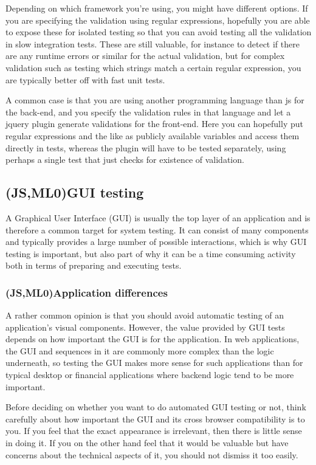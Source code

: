 \documentclass[11pt]{article}
\begin{document}
Depending on which framework you're using, you might have different options. If you are specifying the validation using regular expressions, hopefully you are able to expose these for isolated testing so that you can avoid testing all the validation in slow integration tests. These are still valuable, for instance to detect if there are any runtime errors or similar for the actual validation, but for complex validation such as testing which strings match a certain regular expression, you are typically better off with fast unit tests.

A common case is that you are using another programming language than \gls{js} for the back-end, and you specify the validation rules in that language and let a jquery plugin generate validations for the front-end. Here you can hopefully put regular expressions and the like as publicly available variables and access them directly in tests, whereas the plugin will have to be tested separately, using perhaps a single test that just checks for existence of validation.

\subsection{(JS,ML0)GUI testing}

A Graphical User Interface (GUI) is usually the top layer of an application and is therefore a common target for system testing. It can consist of many components and typically provides a large number of possible interactions, which is why GUI testing is important, but also part of why it can be a time consuming activity both in terms of preparing and executing tests.

\subsubsection{(JS,ML0)Application differences}

A rather common opinion is that you should avoid automatic testing of an application's visual components. However, the value provided by GUI tests depends on how important the GUI is for the application. In web applications, the GUI and sequences in it are commonly more complex than the logic underneath, so testing the GUI makes more sense for such applications than for typical desktop or financial applications where backend logic tend to be more important. \cite[question~21]{Ahnve}

Before deciding on whether you want to do automated GUI testing or not, think carefully about how important the GUI and its cross browser compatibility is to you. If you feel that the exact appearance is irrelevant, then there is little sense in doing it. If you on the other hand feel that it would be valuable but have concerns about the technical aspects of it, you should not dismiss it too easily.
\end{document}
